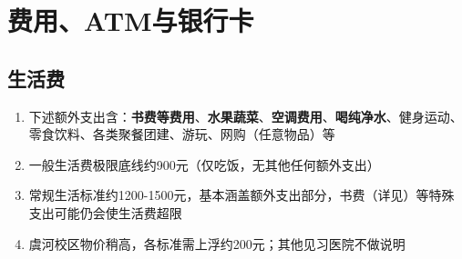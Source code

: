 \section[费用、ATM与银行卡]{费用、ATM与银行卡}

\subsection[生活费]{生活费}
\begin{enumerate}
    \item 下述额外支出含：\textbf{书费等费用}、\textbf{水果蔬菜}、\textbf{空调费用}、\textbf{喝纯净水}、健身运动、零食饮料、各类聚餐团建、游玩、网购（任意物品）等
    \item 一般生活费极限底线约900元（仅吃饭，无其他任何额外支出\footnotemark）
    \item 常规生活标准约1200-1500元，基本涵盖额外支出部分，书费（详见）等特殊支出可能仍会使生活费超限
    \item 虞河校区物价稍高，各标准需上浮约200元；其他见习医院不做说明
\end{enumerate}

